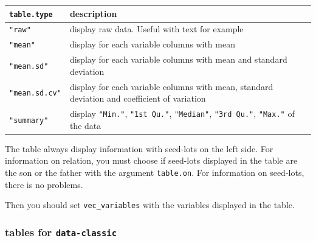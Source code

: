 \documentclass{article}\usepackage[]{graphicx}\usepackage[]{color}
\begin{document}
\begin{center}
\begin{tabular}{ll}
\hline
\texttt{table.type} & description \\
\hline

\texttt{"raw"} & display raw data. Useful with text for example \\
\hline

\texttt{"mean"} & display for each variable columns with mean \\
\hline

\texttt{"mean.sd"} & display for each variable columns with mean and standard deviation \\
\hline

\texttt{"mean.sd.cv"} & display for each variable columns with mean, standard deviation and coefficient of variation \\
\hline

\texttt{"summary"} & display \texttt{"Min."}, \texttt{"1st Qu."}, \texttt{"Median"}, \texttt{"3rd Qu."}, \texttt{"Max."} of the data \\
\hline
\end{tabular}
\end{center}

The table always display information with seed-lots on the left side.
For information on relation, you must choose if seed-lots displayed in the table are the son or the father with the argument \texttt{table.on}.
For information on seed-lots, there is no problems.

Then you should set \texttt{vec\_variables} with the variables displayed in the table.

\subsubsection{tables for \texttt{data-classic} }
\end{document}
